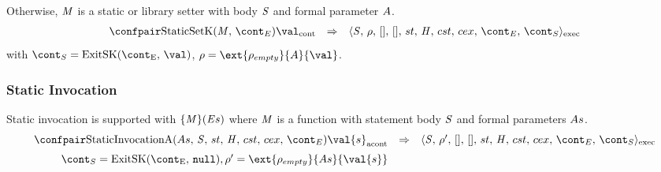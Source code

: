 \documentclass{article}
\begin{document}
\noindent
Otherwise, $\mathit{M}$ is a static or library setter with body $\mathit{S}$ and formal parameter $A$.
\[
  \begin{array}{lcl}
	\cesktrans{
		\contconf{\StaticSetK}{\val}}{
		\execconf{\stmt}{\env}{[]}{[]}{\handler}{\cstrace}{\cex}{\econt}{\scont}}
  \end{array}
\]
with $\scont = \ExitSK{\val}$, $\env = \ext{\env_{empty}}{\formal}{\val}$.

\subsubsection{Static Invocation}
Static invocation is supported with $\{\mathit{M}\}(\mathit{E}{s})$ where $\mathit{M}$ is a function with statement body $\mathit{S}$ and formal parameters $As$.
\[
  \begin{array}{rcl}
	\cesktrans{
		\acontconf{\StaticInvA{\formals}{\stmt}{\strace}{\econt}}{\val{s}}}{
		\execconf{\stmt}{\env'}{[]}{[]}{\handler}{\cstrace}{\cex}{\econt}{\scont}}
	\\[2mm]
	\scont = \ExitSK{\tt{null}},
	\env' = \ext{\env_{empty}}{\formals}{\val{s}}\\[2mm]
  \end{array}
\]
\end{document}
